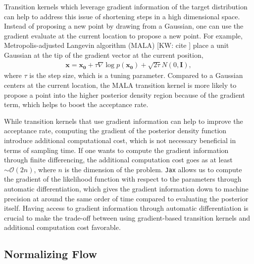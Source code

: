 \documentclass[twocolumn]{aastex631}
\newcommand{\kw}[1]{{\color{rb4}[KW: #1 ]}}
\begin{document}
Transition kernels which leverage gradient information of the target
distribution can help to address this issue of shortening steps in a high
dimensional space. Instead of proposing a new point by drawing from a Gaussian,
one can use the gradient evaluate at the current location to propose a new
point. For example, Metropolis-adjusted Langevin algorithm (MALA) \kw{cite}
place a unit Gaussian at the tip of the gradient vector at the current position,
\begin{align}
    \mathbf{x} = \mathbf{x_0} + \tau \nabla\log{p(\mathbf{x_0})} + \sqrt{2\tau}N(0,\mathbf{I}),
\end{align}
where $\tau$ is the step size, which is a tuning parameter. Compared to a
Gaussian centers at the current location, the MALA transition kernel is more
likely to propose a point into the higher posterior density region because of
the gradient term, which helps to boost the acceptance rate.

While transition kernels that use gradient information can help to improve the
acceptance rate, computing the gradient of the posterior density function
introduce additional computational cost, which is not necessary beneficial in
terms of sampling time. If one wants to compute the gradient information through
finite differencing, the additional computation cost goes as at least $\sim
\mathcal{O}(2n)$, where $n$ is the dimension of the problem. \texttt{Jax} allows
us to compute the gradient of the likelihood function with respect to the
parameters through automatic differentiation, which gives the gradient
information down to machine precision at around the same order of time compared
to evaluating the posterior itself. Having access to gradient information
through automatic differentiation is crucial to make the trade-off between using
gradient-based transition kernels and additional computation cost favorable.



\subsection{Normalizing Flow}
\label{sec:flow}
\end{document}
